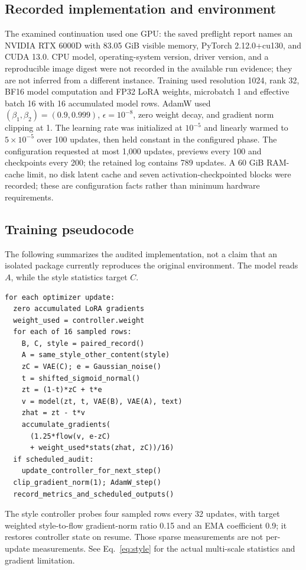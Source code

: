 \documentclass[10pt,letterpaper]{article}
\begin{document}
\subsection{Recorded implementation and environment}
The examined continuation used one GPU: the saved preflight report names an NVIDIA RTX 6000D with 83.05 GiB visible memory, PyTorch 2.12.0+cu130, and CUDA 13.0. CPU model, operating-system version, driver version, and a reproducible image digest were not recorded in the available run evidence; they are not inferred from a different instance. Training used resolution 1024, rank 32, BF16 model computation and FP32 LoRA weights, microbatch 1 and effective batch 16 with 16 accumulated model rows. AdamW used $(\beta_1,\beta_2)=(0.9,0.999)$, $\epsilon=10^{-8}$, zero weight decay, and gradient norm clipping at 1. The learning rate was initialized at $10^{-5}$ and linearly warmed to $5\times10^{-5}$ over 100 updates, then held constant in the configured phase. The configuration requested at most 1,000 updates, previews every 100 and checkpoints every 200; the retained log contains 789 updates. A 60 GiB RAM-cache limit, no disk latent cache and seven activation-checkpointed blocks were recorded; these are configuration facts rather than minimum hardware requirements.

\subsection{Training pseudocode}
The following summarizes the audited implementation, not a claim that an isolated package currently reproduces the original environment. The model reads $A$, while the style statistics target $C$.
\begin{verbatim}
for each optimizer update:
  zero accumulated LoRA gradients
  weight_used = controller.weight
  for each of 16 sampled rows:
    B, C, style = paired_record()
    A = same_style_other_content(style)
    zC = VAE(C); e = Gaussian_noise()
    t = shifted_sigmoid_normal()
    zt = (1-t)*zC + t*e
    v = model(zt, t, VAE(B), VAE(A), text)
    zhat = zt - t*v
    accumulate_gradients(
      (1.25*flow(v, e-zC)
      + weight_used*stats(zhat, zC))/16)
  if scheduled_audit:
    update_controller_for_next_step()
  clip_gradient_norm(1); AdamW_step()
  record_metrics_and_scheduled_outputs()
\end{verbatim}
The style controller probes four sampled rows every 32 updates, with target weighted style-to-flow gradient-norm ratio 0.15 and an EMA coefficient 0.9; it restores controller state on resume. Those sparse measurements are not per-update measurements. See Eq.~\eqref{eq:style} for the actual multi-scale statistics and gradient limitation.
\end{document}
